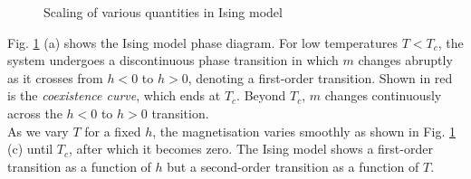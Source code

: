 \begin{figure}[H]
    \centering
    
    \caption{Scaling of various quantities in Ising model }
    \label{critexp}
\end{figure}
\noindent
Fig. \ref{critexp} (a) shows the Ising model phase diagram. For low temperatures $T<T_c$, the system undergoes a discontinuous phase transition in which $m$ changes abruptly as it crosses from $h<0$ to $h>0$, denoting a first-order transition. Shown in red is the \textit{coexistence curve}, which ends at $T_c$. Beyond $T_c$, $m$ changes continuously across the $h<0$ to $h>0$ transition. \\[0.2cm]
As we vary $T$ for a fixed $h$, the magnetisation varies smoothly as shown in Fig.  \ref{critexp} (c) until $T_c$, after which it becomes zero. The Ising model shows a first-order transition as a function of $h$ but a second-order transition as a function of $T$.
